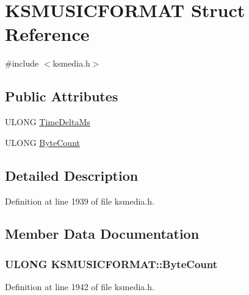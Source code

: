 \hypertarget{struct_k_s_m_u_s_i_c_f_o_r_m_a_t}{}\section{K\+S\+M\+U\+S\+I\+C\+F\+O\+R\+M\+AT Struct Reference}
\label{struct_k_s_m_u_s_i_c_f_o_r_m_a_t}


{\ttfamily \#include $<$ksmedia.\+h$>$}

\subsection*{Public Attributes}
\begin{DoxyCompactItemize}
\item 
U\+L\+O\+NG \hyperlink{struct_k_s_m_u_s_i_c_f_o_r_m_a_t_a101e54dc49512fc63b7a8be95861357f}{Time\+Delta\+Ms}
\item 
U\+L\+O\+NG \hyperlink{struct_k_s_m_u_s_i_c_f_o_r_m_a_t_ace6cb362eceda07b3e21716365747082}{Byte\+Count}
\end{DoxyCompactItemize}


\subsection{Detailed Description}


Definition at line 1939 of file ksmedia.\+h.



\subsection{Member Data Documentation}
\subsubsection[{\texorpdfstring{Byte\+Count}{ByteCount}}]{\setlength{\rightskip}{0pt plus 5cm}U\+L\+O\+NG K\+S\+M\+U\+S\+I\+C\+F\+O\+R\+M\+A\+T\+::\+Byte\+Count}\hypertarget{struct_k_s_m_u_s_i_c_f_o_r_m_a_t_ace6cb362eceda07b3e21716365747082}{}\label{struct_k_s_m_u_s_i_c_f_o_r_m_a_t_ace6cb362eceda07b3e21716365747082}


Definition at line 1942 of file ksmedia.\+h.

